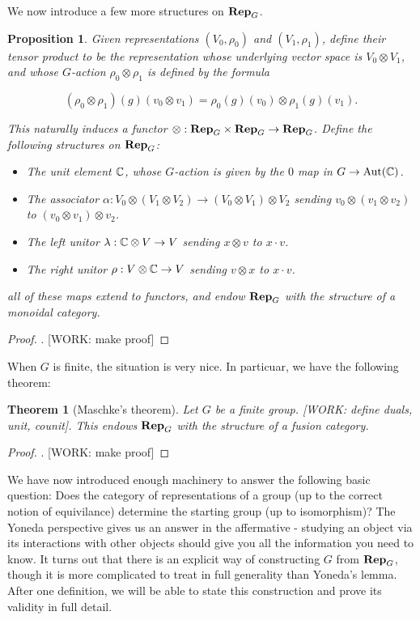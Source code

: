 \documentclass{article}
\newtheorem{theorem}{Theorem}
\newtheorem{proposition}{Proposition}
\theoremstyle{definition}
\numberwithin{figure}{section}
\begin{document}
We now introduce a few more structures on $\bold{Rep}_G$.

\begin{proposition} Given representations $(V_0,\rho_0)$ and $(V_1,\rho_1)$, define their tensor product to be the representation whose underlying vector space is $V_0\otimes V_1$, and whose $G$-action $\rho_0\otimes \rho_1$ is defined by the formula

$$(\rho_0\otimes \rho_1)(g)(v_0\otimes v_1)=\rho_0(g)(v_0)\otimes \rho_1(g)(v_1).$$

This naturally induces a functor $\otimes: \bold{Rep}_G\times \bold{Rep}_G\to \bold{Rep}_G$. Define the following structures on $\bold{Rep}_G$:

\begin{itemize}
\item The unit element $\mathbb{C}$, whose $G$-action is given by the $0$ map in $G\to \mathrm{Aut}(\mathbb{C})$.
\item The associator $\alpha: V_0\otimes (V_1\otimes V_2)\to (V_0\otimes V_1)\otimes V_2$ sending $v_0\otimes (v_1\otimes v_2)$ to $(v_0\otimes v_1)\otimes v_2$.
\item The left unitor $\lambda:\mathbb{C}\otimes V\to V$ sending $x\otimes v$ to $x\cdot v$.
\item The right unitor $\rho: V\otimes \mathbb{C}\to V$ sending $v\otimes x$ to $x\cdot v$.
\end{itemize}

all of these maps extend to functors, and endow $\bold{Rep}_G$ with the structure of a monoidal category.
\end{proposition}
\begin{proof}. [WORK: make proof]
\end{proof}

When $G$ is finite, the situation is very nice. In particuar, we have the following theorem:

\begin{theorem}[Maschke's theorem] Let $G$ be a finite group. [WORK: define duals, unit, counit]. This endows $\bold{Rep}_G$ with the structure of a fusion category.
\end{theorem}
\begin{proof}. [WORK: make proof]
\end{proof}

We have now introduced enough machinery to answer the following basic question: Does the category of representations of a group (up to the correct notion of equivilance) determine the starting group (up to isomorphism)? The Yoneda perspective gives us an answer in the affermative - studying an object via its interactions with other objects should give you all the information you need to know. It turns out that there is an explicit way of constructing $G$ from $\bold{Rep}_G$, though it is more complicated to treat in full generality than Yoneda's lemma. After one definition, we will be able to state this construction and prove its validity in full detail.
\end{document}
